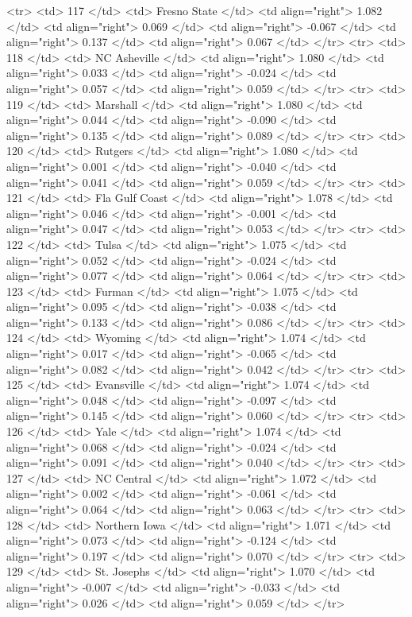   <tr> <td> 117 </td> <td> Fresno State </td> <td align="right"> 1.082 </td> <td align="right"> 0.069 </td> <td align="right"> -0.067 </td> <td align="right"> 0.137 </td> <td align="right"> 0.067 </td> </tr>
  <tr> <td> 118 </td> <td> NC Asheville </td> <td align="right"> 1.080 </td> <td align="right"> 0.033 </td> <td align="right"> -0.024 </td> <td align="right"> 0.057 </td> <td align="right"> 0.059 </td> </tr>
  <tr> <td> 119 </td> <td> Marshall </td> <td align="right"> 1.080 </td> <td align="right"> 0.044 </td> <td align="right"> -0.090 </td> <td align="right"> 0.135 </td> <td align="right"> 0.089 </td> </tr>
  <tr> <td> 120 </td> <td> Rutgers </td> <td align="right"> 1.080 </td> <td align="right"> 0.001 </td> <td align="right"> -0.040 </td> <td align="right"> 0.041 </td> <td align="right"> 0.059 </td> </tr>
  <tr> <td> 121 </td> <td> Fla Gulf Coast </td> <td align="right"> 1.078 </td> <td align="right"> 0.046 </td> <td align="right"> -0.001 </td> <td align="right"> 0.047 </td> <td align="right"> 0.053 </td> </tr>
  <tr> <td> 122 </td> <td> Tulsa </td> <td align="right"> 1.075 </td> <td align="right"> 0.052 </td> <td align="right"> -0.024 </td> <td align="right"> 0.077 </td> <td align="right"> 0.064 </td> </tr>
  <tr> <td> 123 </td> <td> Furman </td> <td align="right"> 1.075 </td> <td align="right"> 0.095 </td> <td align="right"> -0.038 </td> <td align="right"> 0.133 </td> <td align="right"> 0.086 </td> </tr>
  <tr> <td> 124 </td> <td> Wyoming </td> <td align="right"> 1.074 </td> <td align="right"> 0.017 </td> <td align="right"> -0.065 </td> <td align="right"> 0.082 </td> <td align="right"> 0.042 </td> </tr>
  <tr> <td> 125 </td> <td> Evansville </td> <td align="right"> 1.074 </td> <td align="right"> 0.048 </td> <td align="right"> -0.097 </td> <td align="right"> 0.145 </td> <td align="right"> 0.060 </td> </tr>
  <tr> <td> 126 </td> <td> Yale </td> <td align="right"> 1.074 </td> <td align="right"> 0.068 </td> <td align="right"> -0.024 </td> <td align="right"> 0.091 </td> <td align="right"> 0.040 </td> </tr>
  <tr> <td> 127 </td> <td> NC Central </td> <td align="right"> 1.072 </td> <td align="right"> 0.002 </td> <td align="right"> -0.061 </td> <td align="right"> 0.064 </td> <td align="right"> 0.063 </td> </tr>
  <tr> <td> 128 </td> <td> Northern Iowa </td> <td align="right"> 1.071 </td> <td align="right"> 0.073 </td> <td align="right"> -0.124 </td> <td align="right"> 0.197 </td> <td align="right"> 0.070 </td> </tr>
  <tr> <td> 129 </td> <td> St. Josephs </td> <td align="right"> 1.070 </td> <td align="right"> -0.007 </td> <td align="right"> -0.033 </td> <td align="right"> 0.026 </td> <td align="right"> 0.059 </td> </tr>

